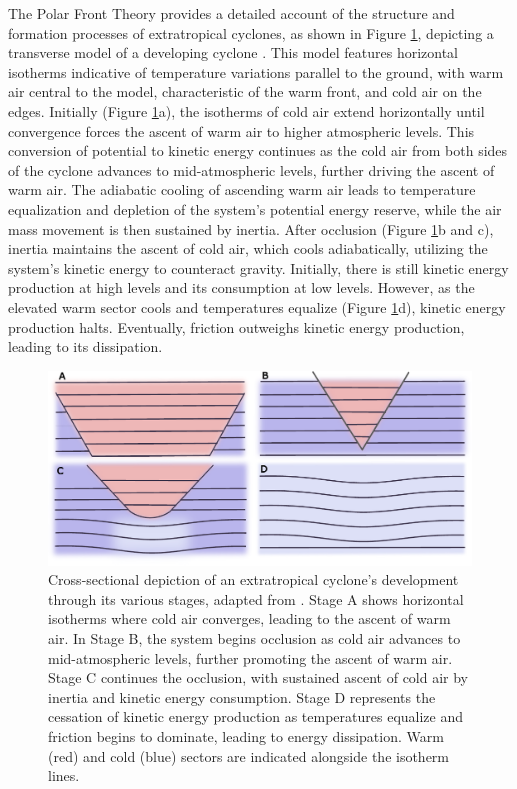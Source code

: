 The Polar Front Theory provides a detailed account of the structure and formation processes of extratropical cyclones, as shown in Figure \ref{extratropical_cyclone_transversal}, depicting a transverse model of a developing cyclone \citep{bjerknes1922life}. This model features horizontal isotherms indicative of temperature variations parallel to the ground, with warm air central to the model, characteristic of the warm front, and cold air on the edges. Initially (Figure \ref{extratropical_cyclone_transversal}a), the isotherms of cold air extend horizontally until convergence forces the ascent of warm air to higher atmospheric levels. This conversion of potential to kinetic energy continues as the cold air from both sides of the cyclone advances to mid-atmospheric levels, further driving the ascent of warm air. The adiabatic cooling of ascending warm air leads to temperature equalization and depletion of the system's potential energy reserve, while the air mass movement is then sustained by inertia. After occlusion (Figure \ref{extratropical_cyclone_transversal}b and c), inertia maintains the ascent of cold air, which cools adiabatically, utilizing the system's kinetic energy to counteract gravity. Initially, there is still kinetic energy production at high levels and its consumption at low levels. However, as the elevated warm sector cools and temperatures equalize (Figure \ref{extratropical_cyclone_transversal}d), kinetic energy production halts. Eventually, friction outweighs kinetic energy production, leading to its dissipation.

\begin{figure}[h]
\begin{center}
\setcaptionmargin{1cm}
\includegraphics[width=0.7\columnwidth,angle=0]{fig/ciclone_oclusion.pdf}
\caption[Extratropical Cyclone - Cross Section]{Cross-sectional depiction of an extratropical cyclone's development through its various stages, adapted from \citet{bjerknes1922life}. Stage A shows horizontal isotherms where cold air converges, leading to the ascent of warm air. In Stage B, the system begins occlusion as cold air advances to mid-atmospheric levels, further promoting the ascent of warm air. Stage C continues the occlusion, with sustained ascent of cold air by inertia and kinetic energy consumption. Stage D represents the cessation of kinetic energy production as temperatures equalize and friction begins to dominate, leading to energy dissipation. Warm (red) and cold (blue) sectors are indicated alongside the isotherm lines.}
\label{extratropical_cyclone_transversal}
\end{center}
\end{figure}

